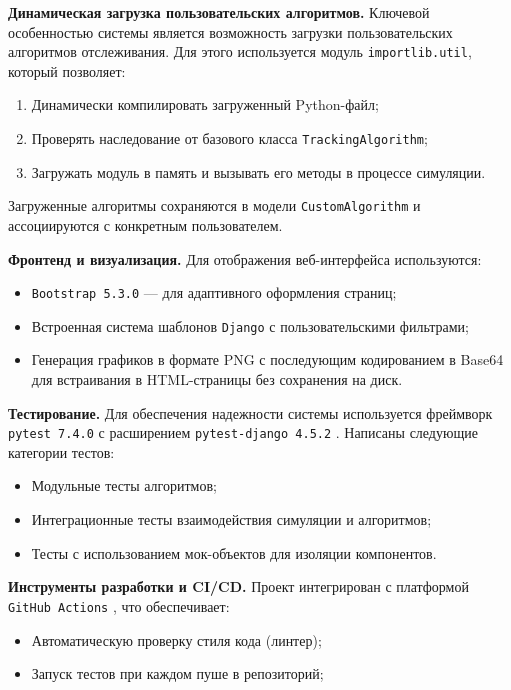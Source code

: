 \textbf{Динамическая загрузка пользовательских алгоритмов.} Ключевой особенностью системы является возможность загрузки пользовательских алгоритмов отслеживания. Для этого используется модуль \texttt{importlib.util}, который позволяет:
\begin{enumerate}
    \item Динамически компилировать загруженный Python-файл;
    \item Проверять наследование от базового класса \texttt{TrackingAlgorithm};
    \item Загружать модуль в память и вызывать его методы в процессе симуляции.
\end{enumerate}
Загруженные алгоритмы сохраняются в модели \texttt{CustomAlgorithm} и ассоциируются с конкретным пользователем.

\textbf{Фронтенд и визуализация.} Для отображения веб-интерфейса используются:
\begin{itemize}
    \item \texttt{Bootstrap 5.3.0} \cite{Bootstrap} --- для адаптивного оформления страниц;
    \item Встроенная система шаблонов \texttt{Django} с пользовательскими фильтрами;
    \item Генерация графиков в формате PNG с последующим кодированием в Base64 для встраивания в HTML-страницы без сохранения на диск.
\end{itemize}

\textbf{Тестирование.} Для обеспечения надежности системы используется фреймворк \texttt{pytest 7.4.0} \cite{pytest} с расширением \texttt{pytest-django 4.5.2} \cite{pytestdjango}. Написаны следующие категории тестов:
\begin{itemize}
    \item Модульные тесты алгоритмов;
    \item Интеграционные тесты взаимодействия симуляции и алгоритмов;
    \item Тесты с использованием мок-объектов для изоляции компонентов.
\end{itemize}

\textbf{Инструменты разработки и CI/CD.} Проект интегрирован с платформой \texttt{GitHub Actions} \cite{actions}, что обеспечивает:
\begin{itemize}
    \item Автоматическую проверку стиля кода (линтер);
    \item Запуск тестов при каждом пуше в репозиторий;
\end{itemize}


